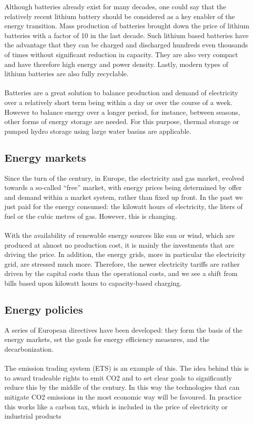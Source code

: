 \documentclass[../summary.tex]{subfiles}
\begin{document}
	Although batteries already exist for many decades, one could say that the relatively recent lithium battery should be considered as a key enabler of the energy transition. Mass production of batteries brought down the price of lithium batteries with a factor of 10 in the last decade. Such lithium based batteries have the advantage that they can be charged and discharged hundreds even thousands of times without significant reduction in capacity. They are also very compact and have therefore high energy and power density. Lastly, modern types of lithium batteries are also fully recyclable. 
	\\\\
	Batteries are a great solution to balance production and demand of electricity over a relatively short term being within a day or over the course of a week. However to balance energy over a longer period, for instance, between seasons, other forms of energy storage are needed. For this purpose, thermal storage or pumped hydro storage using large water basins are applicable. 
	
	\subsection{Energy markets}
	
	 Since the turn of the century, in Europe, the electricity and gas market, evolved towards a so-called “free” market, with energy prices being determined by offer and demand within a market system, rather than fixed up front. In the past we just paid for the energy consumed: the kilowatt hours of electricity, the liters of fuel or the cubic metres of gas. However, this is changing.
	\\\\
	With the availability of renewable energy sources like sun or wind, which are produced at almost no production cost, it is mainly the investments that are driving the price. In addition, the energy grids, more in particular the electricity grid, are stressed much more. Therefore, the newer electricity tariffs are rather driven by the capital costs than the operational costs, and we see a shift from bills based upon kilowatt hours to capacity-based charging. 
	
	\subsection{Energy policies}
	
	A series of European directives have been developed: they form the basis of the energy markets, set the goals for energy efficiency measures, and the decarbonization. 
	\\\\
	The emission trading system (ETS) is an example of this. The idea behind this is to award tradeable rights to emit CO2 and to set clear goals to significantly reduce this by the middle of the century. In this way the technologies that can mitigate CO2 emissions in the most economic way will be favoured. In practice this works like a carbon tax, which is included in the price of electricity or industrial products
	
\end{document}
